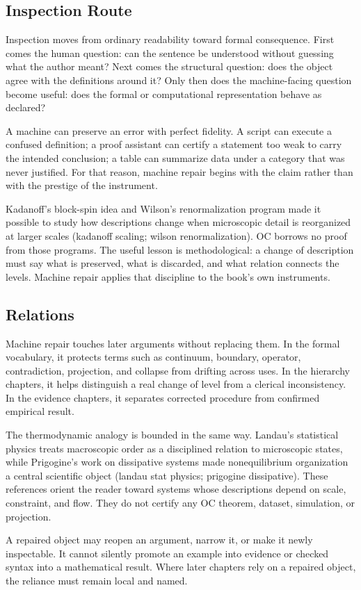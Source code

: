 \documentclass[11pt,a4paper,openany]{book}
\begin{document}
\subsection{Inspection Route}
Inspection moves from ordinary readability toward formal consequence. First comes the human question: can the sentence be understood without guessing what the author meant? Next comes the structural question: does the object agree with the definitions around it? Only then does the machine-facing question become useful: does the formal or computational representation behave as declared? \cite{kadanoff_scaling,wilson_renormalization}\par
A machine can preserve an error with perfect fidelity. A script can execute a confused definition; a proof assistant can certify a statement too weak to carry the intended conclusion; a table can summarize data under a category that was never justified. For that reason, machine repair begins with the claim rather than with the prestige of the instrument.\par
Kadanoff's block-spin idea and Wilson's renormalization program made it possible to study how descriptions change when microscopic detail is reorganized at larger scales (kadanoff scaling; wilson renormalization). OC borrows no proof from those programs. The useful lesson is methodological: a change of description must say what is preserved, what is discarded, and what relation connects the levels. Machine repair applies that discipline to the book's own instruments.\par
\subsection{Relations}
Machine repair touches later arguments without replacing them. In the formal vocabulary, it protects terms such as continuum, boundary, operator, contradiction, projection, and collapse from drifting across uses. In the hierarchy chapters, it helps distinguish a real change of level from a clerical inconsistency. In the evidence chapters, it separates corrected procedure from confirmed empirical result. \cite{kadanoff_scaling,wilson_renormalization}\par
The thermodynamic analogy is bounded in the same way. Landau's statistical physics treats macroscopic order as a disciplined relation to microscopic states, while Prigogine's work on dissipative systems made nonequilibrium organization a central scientific object (landau stat physics; prigogine dissipative). These references orient the reader toward systems whose descriptions depend on scale, constraint, and flow. They do not certify any OC theorem, dataset, simulation, or projection.\par
A repaired object may reopen an argument, narrow it, or make it newly inspectable. It cannot silently promote an example into evidence or checked syntax into a mathematical result. Where later chapters rely on a repaired object, the reliance must remain local and named.\par
\end{document}
